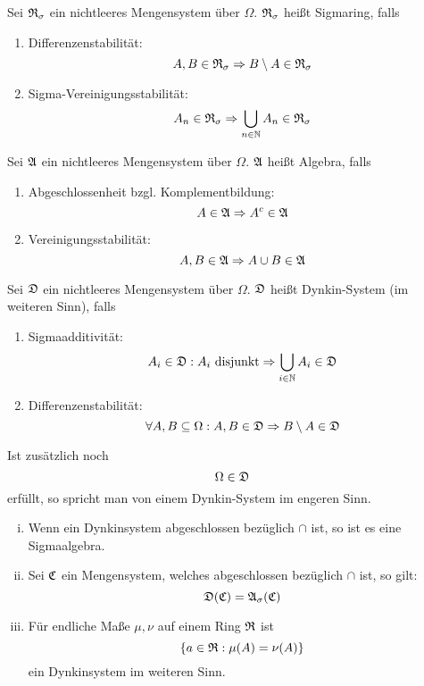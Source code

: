 		\begin{defi}[Sigmaring]
			Sei $\mathfrak{R}_\sigma$ ein nichtleeres Mengensystem über $\Omega$. $\mathfrak{R}_\sigma$ heißt Sigmaring, falls
			\begin{enumerate}
				\item Differenzenstabilität:
				\[ A,B\in\mathfrak{R}_\sigma\Rightarrow B\setminus A\in\mathfrak{R}_\sigma \]
				\item Sigma-Vereinigungsstabilität:
				\[ A_n\in\mathfrak{R}_\sigma\Rightarrow \bigcup_{n\in\mathbb{N}}A_n\in\mathfrak{R}_\sigma \]
			\end{enumerate}
		\end{defi}
		
		\begin{defi}[Algebra]
			Sei $\mathfrak{A}$ ein nichtleeres Mengensystem über $\Omega$. $\mathfrak{A}$ heißt Algebra, falls
			\begin{enumerate}
				\item Abgeschlossenheit bzgl. Komplementbildung:
				\[ A\in\mathfrak{A}\Rightarrow A^c\in\mathfrak{A} \]
				\item Vereinigungsstabilität:
				\[ A,B\in\mathfrak{A}\Rightarrow A\cup B\in\mathfrak{A} \]
			\end{enumerate}
		\end{defi}
		
		\begin{defi}
			Sei $\mathfrak{D}$ ein nichtleeres Mengensystem über $\Omega$. $\mathfrak{D}$ heißt Dynkin-System (im weiteren Sinn), falls
			\begin{enumerate}
				\item Sigmaadditivität:
					\[A_i\in\mathfrak{D}: A_i \text{ disjunkt}\Rightarrow \bigcup_{i\in\mathbb{N}} A_i\in\mathfrak{D}\] 
				\item Differenzenstabilität:
					\[ \forall A,B\subseteq \Omega: A,B\in\mathfrak{D}\Rightarrow B\setminus A\in\mathfrak{D}\]
			\end{enumerate}
			Ist zusätzlich noch
			\[ \Omega\in\mathfrak{D} \]
			erfüllt, so spricht man von einem Dynkin-System im engeren Sinn.
		\end{defi}
		
		\begin{lemma}
			\begin{enumerate}[(i)]
				\item Wenn ein Dynkinsystem abgeschlossen bezüglich $\cap$ ist, so ist es eine Sigmaalgebra.
				\item Sei $\mathfrak{C}$ ein Mengensystem, welches abgeschlossen bezüglich $\cap$ ist, so gilt:
				\[ \mathfrak{D}(\mathfrak{C}) = \mathfrak{A}_\sigma(\mathfrak{C}) \]
				\item Für endliche Maße $\mu,\nu$ auf einem Ring $\mathfrak{R}$ ist
				\[ \{a \in \mathfrak{R}:\mu (A)=\nu(A) \} \]
				ein Dynkinsystem im weiteren Sinn.
			\end{enumerate}
		\end{lemma}
		
